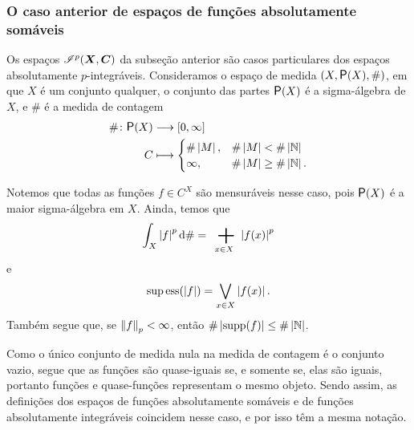 \subsubsection{O caso anterior de espaços de funções absolutamente somáveis}

Os espaços $\mathscr{I}^p(\bm X,\bm C)$ da subseção anterior são casos particulares dos espaços absolutamente $p$-integráveis. Consideramos o espaço de medida $(X,\p(X),\#)$, em que $X$ é um conjunto qualquer, o conjunto das partes $\p(X)$ é a sigma-álgebra de $X$, e $\#$ é a medida de contagem
	\begin{align*}
	\func{\#}{\p(X)}{\intff{0}{\infty}}{C}{
		\begin{cases}
			\card{M},& \card{M}<\card{\N} \\
			\infty,& \card{M} \geq \card{\N}.
		\end{cases}
	}
	\end{align*}

Notemos que todas as funções $f \in C^X$ são mensuráveis nesse caso, pois $\p(X)$ é a maior sigma-álgebra em $X$.
Ainda, temos que
	\begin{equation*}
	\int_X \abs{f}^p \dd\# = \sum_{x \in X} \abs{f(x)}^p
	\end{equation*}
e
	\begin{equation*}
	\operatorname{sup\,ess}(\left\vert{f}\right\vert) = \bigvee_{x \in X} \left\vert{f(x)}\right\vert.
	\end{equation*}
Também segue que, se $\left\Vert{f}\right\Vert_p < \infty$, então $\#\left\lvert{\operatorname{supp}(f)}\right\rvert \leq \#\left\lvert{\mathbb{N}}\right\rvert$.

Como o único conjunto de medida nula na medida de contagem é o conjunto vazio, segue que as funções são quase-iguais se, e somente se, elas são iguais, portanto funções e quase-funções representam o mesmo objeto. Sendo assim, as definições dos espaços de funções absolutamente somáveis e de funções absolutamente integráveis coincidem nesse caso, e por isso têm a mesma notação.


